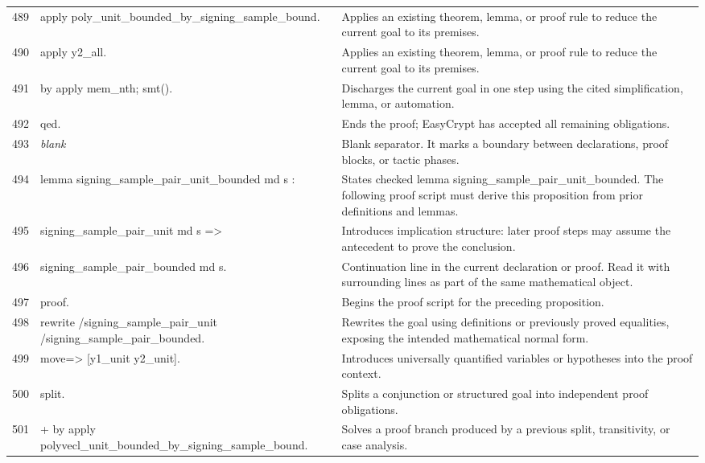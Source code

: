 \documentclass[10pt]{article}
\begin{document}
\begin{longtable}{r L{0.53\textwidth} L{0.37\textwidth}}
489 & {\ttfamily\scriptsize apply poly\_unit\_bounded\_by\_signing\_sample\_bound.} & Applies an existing theorem, lemma, or proof rule to reduce the current goal to its premises. \\
490 & {\ttfamily\scriptsize apply y2\_all.} & Applies an existing theorem, lemma, or proof rule to reduce the current goal to its premises. \\
491 & {\ttfamily\scriptsize by apply mem\_nth; smt().} & Discharges the current goal in one step using the cited simplification, lemma, or automation. \\
492 & {\ttfamily\scriptsize qed.} & Ends the proof; EasyCrypt has accepted all remaining obligations. \\
493 & {\ttfamily\scriptsize \emph{blank}} & Blank separator.  It marks a boundary between declarations, proof blocks, or tactic phases. \\
494 & {\ttfamily\scriptsize lemma signing\_sample\_pair\_unit\_bounded md s :} & States checked lemma signing\_sample\_pair\_unit\_bounded.  The following proof script must derive this proposition from prior definitions and lemmas. \\
495 & {\ttfamily\scriptsize   signing\_sample\_pair\_unit md s =>} & Introduces implication structure: later proof steps may assume the antecedent to prove the conclusion. \\
496 & {\ttfamily\scriptsize   signing\_sample\_pair\_bounded md s.} & Continuation line in the current declaration or proof.  Read it with surrounding lines as part of the same mathematical object. \\
497 & {\ttfamily\scriptsize proof.} & Begins the proof script for the preceding proposition. \\
498 & {\ttfamily\scriptsize rewrite /signing\_sample\_pair\_unit /signing\_sample\_pair\_bounded.} & Rewrites the goal using definitions or previously proved equalities, exposing the intended mathematical normal form. \\
499 & {\ttfamily\scriptsize move=> [y1\_unit y2\_unit].} & Introduces universally quantified variables or hypotheses into the proof context. \\
500 & {\ttfamily\scriptsize split.} & Splits a conjunction or structured goal into independent proof obligations. \\
501 & {\ttfamily\scriptsize + by apply polyvecl\_unit\_bounded\_by\_signing\_sample\_bound.} & Solves a proof branch produced by a previous split, transitivity, or case analysis. \\

\end{longtable}
\end{document}
